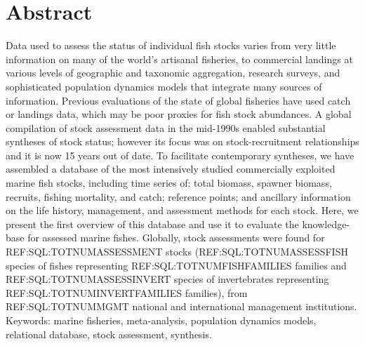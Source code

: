 \section*{Abstract}

Data used to assess the status of individual fish stocks varies from
very little information on many of the world's artisanal fisheries, to
commercial landings at various levels of geographic and taxonomic
aggregation, research surveys, and sophisticated population dynamics
models that integrate many sources of information.  Previous
evaluations of the state of global fisheries have used catch or
landings data, which may be poor proxies for fish stock abundances. A
global compilation of stock assessment data in the mid-1990s enabled
substantial syntheses of stock status; however its focus was on
stock-recruitment relationships and it is now 15 years out of date. To
facilitate contemporary syntheses, we have assembled a database of the
most intensively studied commercially exploited marine fish stocks,
including time series of: total biomass, spawner biomass, recruits,
fishing mortality, and catch; reference points; and ancillary
information on the life history, management, and assessment methods
for each stock.  Here, we present the first overview of this database
and use it to evaluate the knowledge-base for assessed marine fishes.
Globally, stock assessments were found for REF:SQL:TOTNUMASSESSMENT
stocks (REF:SQL:TOTNUMASSESSFISH species of fishes representing
REF:SQL:TOTNUMFISHFAMILIES families and REF:SQL:TOTNUMASSESSINVERT
species of invertebrates representing REF:SQL:TOTNUMINVERTFAMILIES
families), from REF:SQL:TOTNUMMGMT national and international
management institutions. \\

\noindent Keywords: marine fisheries, meta-analysis, population dynamics models, relational database, stock assessment, synthesis.


